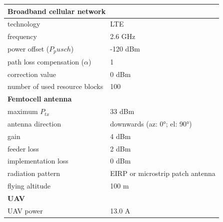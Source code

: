 \begin{table}[!htb]
\centering
\begin{tabular}[t]{ll}
        \toprule
        \multicolumn{2}{l}{\textbf{Broadband cellular network}} \\
        \hline
        \hspace{3mm}  technology                          & LTE     \\
        \hspace{3mm}  frequency                           & 2.6 GHz \\
        \hspace{3mm}  power offset ($P_pusch$)            & -120 dBm  \\
        \hspace{3mm}  path loss compensation ($\alpha$)   & 1  \\
        \hspace{3mm}  correction value                    & 0 dBm  \\
        \hspace{3mm}  number of used resource blocks      & 100  \\
        \hline
        \multicolumn{2}{l}{\textbf{Femtocell antenna}} \\
        \hline  
        \hspace{3mm}  maximum $P_{tx}$                    & 33 dBm   \\
        \hspace{3mm}  antenna  direction                  & downwards (az: \ang{0}; el: \ang{90})    \\ 
        \hspace{3mm}  gain                                & 4 dBm   \\ 
        \hspace{3mm}  feeder loss                         & 2 dBm   \\ 
        \hspace{3mm}  implementation loss                 & 0 dBm   \\
        \hspace{3mm}  radiation pattern                   & \acs{EIRP} or microstrip patch antenna\\
        \hspace{3mm}  flying altitude                     & 100 m  \\
        \hline
        \multicolumn{2}{l}{\textbf{UAV}} \\
        \hline  
        \hspace{3mm}  UAV power                           & 13.0 A   \\

\end{tabular}
\end{table}
